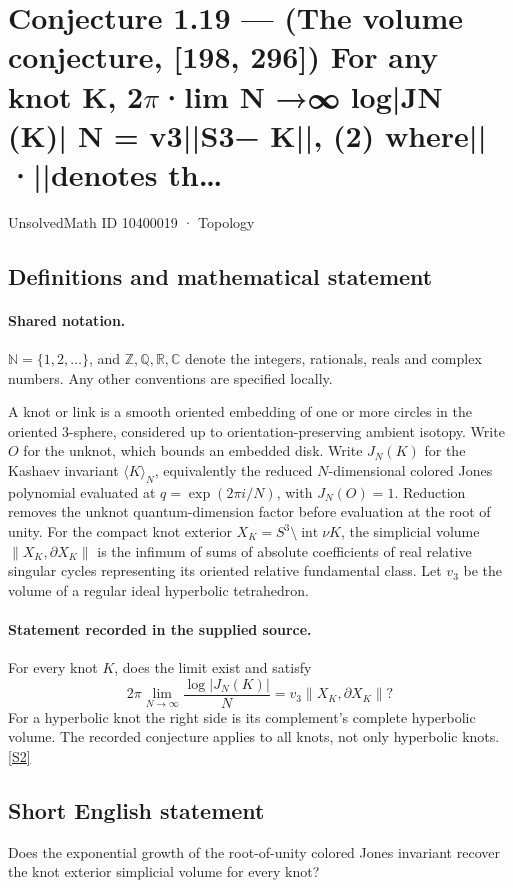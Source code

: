 \documentclass[11pt]{article}
\newcommand{\sref}[2]{\hyperlink{source:#1:#2}{[S#2]}}
\begin{document}
\setcounter{section}{10400018}
\section{Conjecture 1.19 — (The volume conjecture, [198, 296]) For any knot K, 2\texorpdfstring{$\pi$}{pi}·lim N →∞ log|JN (K)| N = v3||S3− K||, (2) where||·||denotes th…}\label{10400019}
{\small\sffamily UnsolvedMath ID 10400019 · Topology}
\subsection{Definitions and mathematical statement}

\paragraph{Shared notation.}$\mathbb N=\{1,2,\ldots\}$, and $\mathbb Z,\mathbb Q,\mathbb R,\mathbb C$ denote the integers, rationals, reals and complex numbers. Any other conventions are specified locally.


A knot or link is a smooth oriented embedding of one or more circles in the oriented $3$-sphere, considered up to orientation-preserving ambient isotopy. Write $O$ for the unknot, which bounds an embedded disk. Write $J_N(K)$ for the Kashaev invariant $\langle K\rangle_N$, equivalently the reduced $N$-dimensional colored Jones polynomial evaluated at $q=\exp(2\pi i/N)$, with $J_N(O)=1$. Reduction removes the unknot quantum-dimension factor before evaluation at the root of unity. For the compact knot exterior $X_K=S^3\setminus\operatorname{int}\nu K$, the simplicial volume $\|X_K,\partial X_K\|$ is the infimum of sums of absolute coefficients of real relative singular cycles representing its oriented relative fundamental class. Let $v_3$ be the volume of a regular ideal hyperbolic tetrahedron.
\paragraph{Statement recorded in the supplied source.}
For every knot $K$, does the limit exist and satisfy
\[2\pi\lim_{N\to\infty}\frac{\log|J_N(K)|}{N}
=v_3\|X_K,\partial X_K\|?\]
For a hyperbolic knot the right side is its complement's complete hyperbolic volume. The recorded conjecture applies to all knots, not only hyperbolic knots. \sref{10400019}{2}
\subsection{Short English statement}
Does the exponential growth of the root-of-unity colored Jones invariant recover the knot exterior simplicial volume for every knot?
\end{document}
